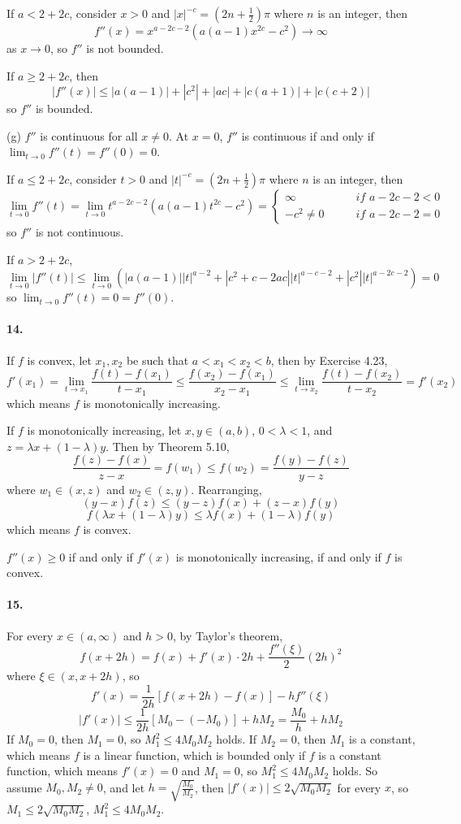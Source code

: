 \documentclass[a4paper]{article}
\begin{document}
If $a<2+2c$, consider $x>0$ and $|x|^{-c}=(2n+\frac{1}{2})\pi$ where $n$ is an integer, then
\[
f''(x)=x^{a-2c-2}\left(a(a-1)x^{2c}-c^2 \right)\to\infty
\]
as $x\to0$, so $f''$ is not bounded.

If $a\geq 2+2c$, then
\[
|f''(x)|\leq |a(a-1)|+|c^2|+|ac|+|c(a+1)|+|c(c+2)|
\]
so $f''$ is bounded.
\medskip

(g)
$f''$ is continuous for all $x\neq0$. At $x=0$,\; $f''$ is continuous if and only if $\lim_{t\to0}f''(t)=f''(0)=0$.

If $a\leq2+2c$, consider $t>0$ and $|t|^{-c}=(2n+\frac{1}{2})\pi$ where $n$ is an integer, then
\[
\lim_{t\to0}f''(t)=\lim_{t\to0}t^{a-2c-2}\left(a(a-1)t^{2c}-c^2 \right)=\begin{cases}
\infty\qquad & \textit{if $a-2c-2<0$}\\
-c^2\neq0\qquad & \textit{if $a-2c-2=0$}
\end{cases}
\]
so $f''$ is not continuous.

If $a>2+2c$, 
\[
\lim_{t\to0}|f''(t)|\leq \lim_{t\to0}\left(|a(a-1)||t|^{a-2}+|c^2+c-2ac||t|^{a-c-2}+|c^2||t|^{a-2c-2} \right)=0
\]
so $\lim_{t\to0}f''(t)=0=f''(0)$.

\paragraph{14.}
If $f$ is convex, let $x_1,x_2$ be such that $a<x_1<x_2<b$, then by Exercise 4.23, 
\[
f'(x_1)=\lim_{t\to x_1}\frac{f(t)-f(x_1)}{t-x_1}\leq\frac{f(x_2)-f(x_1)}{x_2-x_1}\leq\lim_{t\to x_2}\frac{f(t)-f(x_2)}{t-x_2}=f'(x_2)
\]
which means $f$ is monotonically increasing.

If $f$ is monotonically increasing, let $x,y\in(a,b)$,\; $0<\lambda<1$, and $z=\lambda x+(1-\lambda)y$. Then by Theorem 5.10,
\[
\frac{f(z)-f(x)}{z-x}=f(w_1)\leq f(w_2)=\frac{f(y)-f(z)}{y-z}
\]
where $w_1\in(x,z)$ and $w_2\in(z,y)$. Rearranging,
\[
(y-x)f(z)\leq(y-z)f(x)+(z-x)f(y)
\]
\[
f(\lambda x+(1-\lambda)y)\leq \lambda f(x)+(1-\lambda)f(y)
\]
which means $f$ is convex.

$f''(x)\geq0$ if and only if $f'(x)$ is monotonically increasing, if and only if $f$ is convex.

\paragraph{15.}
For every $x\in(a,\infty)$ and $h>0$, by Taylor's theorem, 
\[
f(x+2h)=f(x)+f'(x)\cdot2h+\frac{f''(\xi)}{2}(2h)^2
\]
where $\xi\in(x,x+2h)$, so
\[
f'(x)=\frac{1}{2h}\left[f(x+2h)-f(x) \right]-hf''(\xi)
\]
\[
|f'(x)|\leq\frac{1}{2h}\left[M_0-(-M_0) \right]+hM_2=\frac{M_0}{h}+hM_2
\]
If $M_0=0$, then $M_1=0$, so $M_1^2\leq4M_0M_2$ holds. If $M_2=0$, then $M_1$ is a constant, which means $f$ is a linear function, which is bounded only if $f$ is a constant function, which means $f'(x)=0$ and $M_1=0$, so $M_1^2\leq4M_0M_2$ holds. So assume $M_0,M_2\neq0$, and let $h=\sqrt{\frac{M_0}{M_2}}$, then $|f'(x)|\leq2\sqrt{M_0M_2}$ for every $x$, so $M_1\leq2\sqrt{M_0M_2}$,\; $M_1^2\leq4M_0M_2$.
\end{document}
